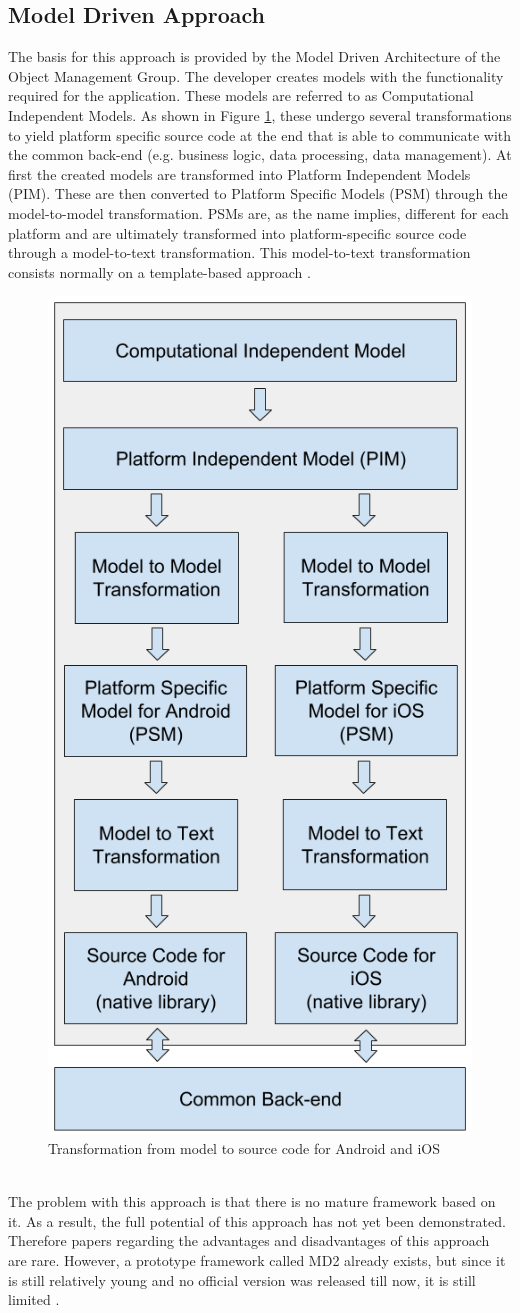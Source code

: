 \documentclass[Bachelor,BIF,english]{twbook}
\begin{document}
\subsection{Model Driven Approach}
The basis for this approach is provided by the Model Driven Architecture of the Object Management Group. The developer creates models with the functionality required for the application. These models are referred to as Computational Independent Models. As shown in Figure \ref{Fig2}, these undergo several transformations to yield platform specific source code at the end that is able to communicate with the common back-end (e.g. business logic, data processing, data management). At first the created models are transformed into Platform Independent Models (PIM). These are then converted to Platform Specific Models (PSM) through the model-to-model transformation. PSMs are, as the name implies, different for each platform and are ultimately transformed into platform-specific source code through a model-to-text transformation. This model-to-text transformation consists normally on a template-based approach \cite[p.~4]{7479278} \cite[p.~3]{7934674}.
\begin{figure}[!htbp]
\centering
\includegraphics[width=0.5\linewidth]{PICs/MDA.png}
\caption{Transformation from model to source code for Android and iOS \cite[p.~4]{7479278} \cite[p.~3]{7934674}}\label{Fig2}
\end{figure}
\\[\baselineskip]
The problem with this approach is that there is no mature framework based on it. As a result, the full potential of this approach has not yet been demonstrated. Therefore papers regarding the advantages and disadvantages of this approach are rare. However, a prototype framework called MD2 \cite{MD2} already exists, but since it is still relatively young and no official version was released till now, it is still limited \cite[p.~3-4]{7934674}.
\end{document}
